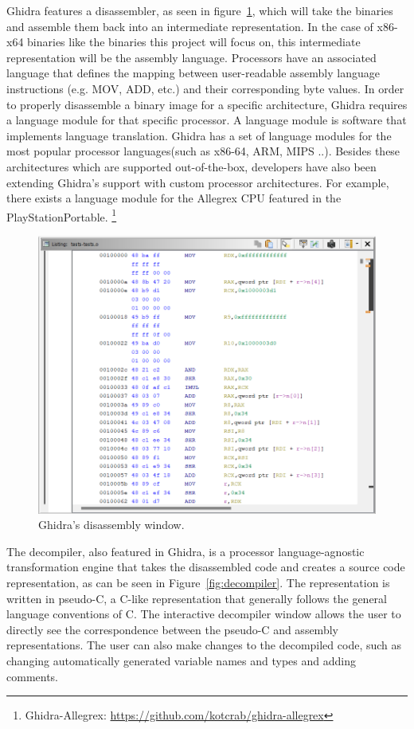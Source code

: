 Ghidra features a disassembler, as seen in figure~\ref{fig:disassembler}, which will take the binaries and assemble them back into an intermediate representation. In the case of x86-x64 binaries like the binaries this project will focus on, this intermediate representation will be the assembly language. Processors have an associated language that defines the mapping
between user-readable assembly language instructions (e.g. MOV, ADD, etc.) and their corresponding byte values. In order to properly disassemble a binary image for a specific architecture, Ghidra requires a language module for that specific processor. A language module is software that implements language translation. Ghidra has a set of language modules for the most popular processor languages(such as x86-64, ARM, MIPS ..). Besides these architectures which are supported out-of-the-box, developers have also been extending Ghidra's support with custom processor architectures. For example, there exists a language module for the Allegrex CPU featured in the PlayStationPortable.  \footnote{Ghidra-Allegrex: \url{https://github.com/kotcrab/ghidra-allegrex}}
\begin{figure}[tbh]
  \centering
  \includegraphics[width=\linewidth]{img/disassembler.png}
  \caption{Ghidra's disassembly window.}
  \label{fig:disassembler}
\end{figure}

The decompiler, also featured in Ghidra, is a processor language-agnostic transformation engine that takes the disassembled code and creates a source code representation, as can be seen in Figure~\ref{fig:decompiler}. The representation is written in pseudo-C, a C-like representation that generally follows the general language conventions of C. The interactive decompiler window allows the user to directly see the correspondence between the pseudo-C and assembly representations. The user can also make changes to the decompiled code, such as changing automatically generated variable names and types and adding comments. 

